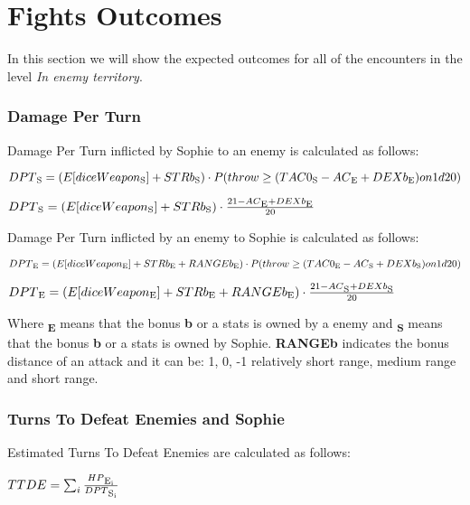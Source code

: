 \section{Fights Outcomes}
In this section we will show the expected outcomes for all of the encounters in the level \textit{In enemy territory}. 

\subsubsection{Damage Per Turn}
Damage Per Turn inflicted by Sophie to an enemy is calculated as follows: 
\begin{center}
  $DPT\textsubscript{S}=(E[diceWeapon\textsubscript{S}] + STRb\textsubscript{S}) \cdot P(throw \ge (TAC0\textsubscript{S} - AC\textsubscript{E} + DEXb\textsubscript{E}) on 1d20)$
\end{center}
\begin{center}
  $DPT\textsubscript{S}=(E[diceWeapon\textsubscript{S}] + STRb\textsubscript{S}) \cdot \frac{21-AC\textsubscript{E} + DEXb\textsubscript{E}}{20}$
  \end{center}

Damage Per Turn inflicted by an enemy to Sophie is calculated as follows:
\begin{center}
  $DPT\textsubscript{E}=(E[diceWeapon\textsubscript{E}] + STRb\textsubscript{E} + RANGEb\textsubscript{E}) \cdot P(throw \ge (TAC0\textsubscript{E} - AC\textsubscript{S} + DEXb\textsubscript{S}) on 1d20)$
\end{center}
\begin{center}
  $DPT\textsubscript{E}=(E[diceWeapon\textsubscript{E}] + STRb\textsubscript{E} + RANGEb\textsubscript{E}) \cdot \frac{21-AC\textsubscript{S} + DEXb\textsubscript{S}}{20}$
  \end{center}

Where \textbf{\textsubscript{E}} means that the bonus \textbf{b} or a stats is owned by a enemy and \textbf{\textsubscript{S}} means that the bonus \textbf{b} or a stats is owned by Sophie. \textbf{RANGEb} indicates the bonus distance of an attack and it can be: 1, 0, -1 relatively short range, medium range and short range.

\subsubsection{Turns To Defeat Enemies and Sophie}
Estimated Turns To Defeat Enemies are calculated as follows:
\begin{center}
  $TTDE=\sum_{i}\frac{HP\textsubscript{E\textsubscript{i}}}{DPT\textsubscript{S\textsubscript{i}}}$
  \end{center}


